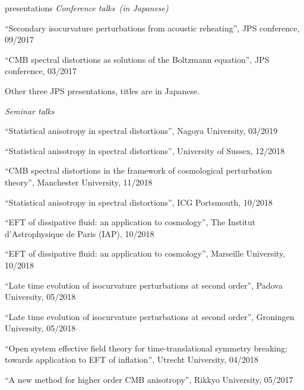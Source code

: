 \documentclass[a4paper]{resume} %
\begin{document}
\begin{rSection}{presentations}
\noindent\textit{Conference talks~(in Japanese)}

\begin{etaremune}
    \item 
    ``Secondary isocurvature perturbations from acoustic reheating'', JPS conference, 09/2017
    \item
    ``CMB spectral distortions as solutions of the Boltzmann equation'', JPS conference, 03/2017
    \item
    Other three JPS presentations, titles are in Japanese.
\end{etaremune}


\noindent\textit{Seminar talks}

\begin{etaremune}
	\item
    ``Statistical anisotropy in spectral distortions'', Nagoya University, 03/2019
    \item
    ``Statistical anisotropy in spectral distortions'', University of Sussex, 12/2018
    \item
    ``CMB spectral distortions in the framework of cosmological perturbation theory'', Manchester University, 11/2018
    
    \item
    ``Statistical anisotropy in spectral distortions'', ICG Portsmouth, 10/2018

    \item
    ``EFT of dissipative fluid: an application to cosmology'', The Institut d'Astrophysique de Paris (IAP), 10/2018

    \item
    ``EFT of dissipative fluid: an application to cosmology'', Marseille University, 10/2018

    \item
    ``Late time evolution of isocurvature perturbations at second order'', Padova University, 05/2018

    \item
    ``Late time evolution of isocurvature perturbations at second order'', Groningen University, 05/2018

    \item
    ``Open system effective field theory for time-translational symmetry breaking: towards application to EFT of inflation'', Utrecht University, 04/2018

    \item
    ``A new method for higher order CMB anisotropy'', Rikkyo University, 05/2017


\end{etaremune}
\end{rSection}
\end{document}
